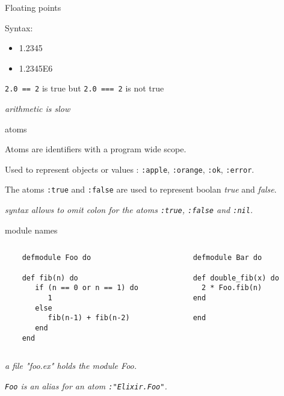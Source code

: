 \begin{frame}{Floating points}

  Syntax:
  \space{10pt}
  \begin{itemize}
  \item 1.2345 \pause
  \item 1.2345E6 \pause
  \end{itemize}

  \vspace{20pt}
  {\tt 2.0 == 2} is true  but {\tt 2.0 === 2} is not true

  \vspace{20pt}\pause
  {\em arithmetic is slow}  
\end{frame}

\begin{frame}{atoms}

  Atoms are identifiers with a program wide scope. \pause

  \vspace{20pt}
  Used to represent objects or values : {\tt :apple}, {\tt :orange}, {\tt :ok}, {\tt :error}. \pause

  \vspace{20pt}
  The atoms {\tt :true} and {\tt :false} are used to represent boolan {\em true} and {\em false}.\pause
  

  \vspace{20pt}
  {\em syntax allows to omit colon for the atoms {\tt :true}, {\tt :false} and {\tt :nil}.}
    
\end{frame}

\begin{frame}[fragile]{module names}

\begin{columns}[t]
\begin{column}{0.5\textwidth}
  \begin{lstlisting}
    defmodule Foo do
      
    def fib(n) do
       if (n == 0 or n == 1) do 
          1
       else
          fib(n-1) + fib(n-2) 
       end
    end
  \end{lstlisting}
\end{column} \pause
\begin{column}{0.5\textwidth}
  \begin{lstlisting}
  defmodule Bar do

  def double_fib(x) do
    2 * Foo.fib(n)
  end

  end
\end{lstlisting}
\end{column}
\end{columns}

\vspace{20pt}\pause
  {\em a file "foo.ex" holds the module Foo.} 
  
\vspace{20pt}\pause
  {\em {\tt Foo} is an alias for an atom {\tt :"Elixir.Foo"}.}
  
\end{frame}


